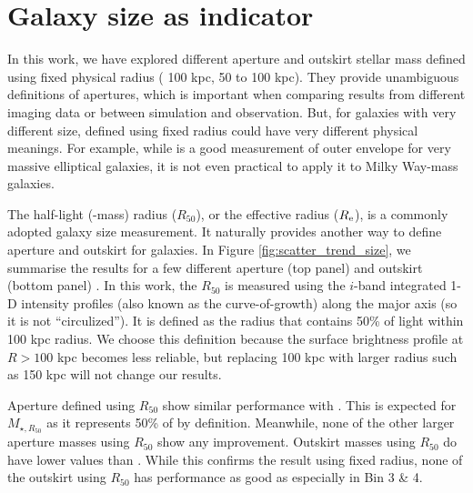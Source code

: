 \documentclass[fleqn,usenatbib,useAMS]{mnras}
\begin{document}
\section{Galaxy size as \texorpdfstring{\mvir{}}{Mvir} indicator}
	\label{app:size}

    In this work, we have explored different aperture and outskirt stellar mass defined using 
    fixed physical radius (\eg{} 100 kpc, 50 to 100 kpc).
    They provide unambiguous definitions of apertures, which is important when comparing results
    from different imaging data or between simulation and observation.
    But, for galaxies with very different size, \mstar{} defined using fixed radius could have 
    very different physical meanings. 
    For example, while  is a good measurement of outer envelope \mstar{} for very 
    massive elliptical galaxies, it is not even practical to apply it to Milky Way-mass galaxies.
    
    The half-light (-mass) radius ($R_{50}$), or the effective radius ($R_{\rm e}$), is a commonly 
    adopted galaxy size measurement. 
    It naturally provides another way to define aperture and outskirt for galaxies. 
    In Figure \ref{fig:scatter_trend_size}, we summarise the \topn{} results for a few different 
    aperture (top panel) and outskirt (bottom panel) \mstar{}. 
    In this work, the $R_{50}$ is measured using the $i$-band integrated 1-D intensity profiles 
    (also known as the curve-of-growth) along the major axis (so it is not ``circulized''). 
    It is defined as the radius that contains 50\% of light within 100 kpc radius.
    We choose this definition because the surface brightness profile at $R>100$ kpc becomes 
    less reliable, but replacing 100 kpc with larger radius such as 150 kpc will not change our
    results.
    
    Aperture \mstar{} defined using $R_{50}$ show similar performance with . 
    This is expected for $M_{\star, R_{50}}$ as it represents 50\% of  by definition. 
    Meanwhile, none of the other larger aperture masses using $R_{50}$ show any improvement.
    Outskirt masses using $R_{50}$ do have lower \sigmvir{} values than .
    While this confirms the result using fixed radius, none of the outskirt \mstar{} using $R_{50}$ 
    has performance as good as  especially in Bin 3 \& 4.
    
\end{document}
